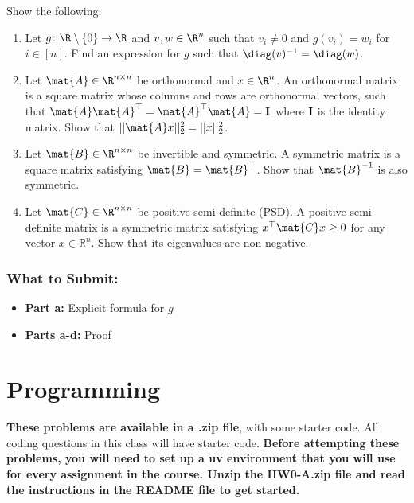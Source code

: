 \documentclass{article}
\begin{document}
\begin{aprob}\label{prob:matrixtype}
    Show the following:
    \begin{enumerate}
        \item {} Let $g\colon \R\setminus\{0\}\rightarrow \R$ and $v, w \in \R^n$ such that $v_i \neq 0$ and $g(v_i) = w_i$ for $i\in[n]$. Find an expression for $g$ such that $\diag(v)^{-1} = \diag(w)$.
        \item {} Let $\mat{A} \in \R^{n \times n}$ be orthonormal and $x \in \R^n$. 
        An orthonormal matrix is a square matrix whose columns and rows are orthonormal vectors, such that $ \mat{A}\mat{A}^\top = \mat{A}^\top \mat{A} = {\bf I}$ where ${\bf I}$ is the identity matrix. 
        Show that $||\mat{A}x||_2^2 = ||x||_2^2$.
        \item {} Let $\mat{B} \in \R^{n \times n}$ be invertible and symmetric. A symmetric matrix is a square matrix satisfying $\mat{B}=\mat{B}^\top$. Show that $\mat{B}^{-1}$ is also symmetric.
        \item {} Let $\mat{C} \in \R^{n \times n}$ be positive semi-definite (PSD). A positive semi-definite matrix is a symmetric matrix satisfying $x^\top \mat{C} x \geq 0$ for any vector $x\in{\mathbb R}^n$. Show that its eigenvalues are non-negative.
    \end{enumerate}
    \subsubsection*{What to Submit:}
    \begin{itemize}
        \item \textbf{Part a:} Explicit formula for $g$
        \item \textbf{Parts a-d:} Proof
    \end{itemize}
\end{aprob}


\section*{Programming}
\textbf{These problems are available in a .zip file}, with some starter code. All coding questions in this class will have starter code.
\textbf{Before attempting these problems, you will need to set up a uv environment that you will use for every assignment in the course. Unzip the HW0-A.zip file and read the instructions in the README file to get started.}
\end{document}
